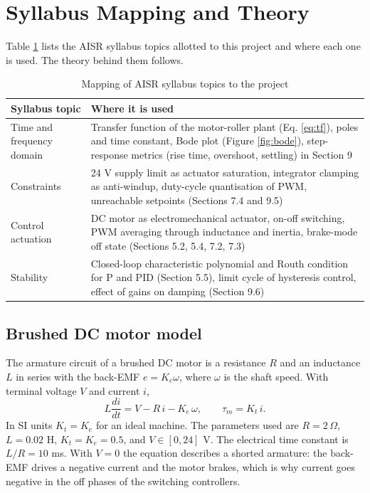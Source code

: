 \documentclass[12pt,a4paper]{article}
\begin{document}
\section{Syllabus Mapping and Theory}

Table \ref{tab:syllabus} lists the AISR syllabus topics allotted to this project and where each one is used. The theory behind them follows.

\begin{table}[htbp]
\centering
\caption{Mapping of AISR syllabus topics to the project}
\label{tab:syllabus}
\begin{tabular}{|p{3.6cm}|p{9.5cm}|}
\hline
\textbf{Syllabus topic} & \textbf{Where it is used} \\ \hline
Time and frequency domain & Transfer function of the motor-roller plant (Eq. \ref{eq:tf}), poles and time constant, Bode plot (Figure \ref{fig:bode}), step-response metrics (rise time, overshoot, settling) in Section 9 \\ \hline
Constraints & 24 V supply limit as actuator saturation, integrator clamping as anti-windup, duty-cycle quantisation of PWM, unreachable setpoints (Sections 7.4 and 9.5) \\ \hline
Control actuation & DC motor as electromechanical actuator, on-off switching, PWM averaging through inductance and inertia, brake-mode off state (Sections 5.2, 5.4, 7.2, 7.3) \\ \hline
Stability & Closed-loop characteristic polynomial and Routh condition for P and PID (Section 5.5), limit cycle of hysteresis control, effect of gains on damping (Section 9.6) \\ \hline
\end{tabular}
\end{table}

\subsection{Brushed DC motor model}

The armature circuit of a brushed DC motor is a resistance $R$ and an inductance $L$ in series with the back-EMF $e = K_e \omega$, where $\omega$ is the shaft speed. With terminal voltage $V$ and current $i$,
\begin{equation}
L \frac{di}{dt} = V - R\,i - K_e\,\omega, \qquad \tau_m = K_t\,i.
\label{eq:motor}
\end{equation}
In SI units $K_t = K_e$ for an ideal machine. The parameters used are $R = 2\,\Omega$, $L = 0.02$ H, $K_t = K_e = 0.5$, and $V \in [0, 24]$ V. The electrical time constant is $L/R = 10$ ms. With $V = 0$ the equation describes a shorted armature: the back-EMF drives a negative current and the motor brakes, which is why current goes negative in the off phases of the switching controllers.
\end{document}
